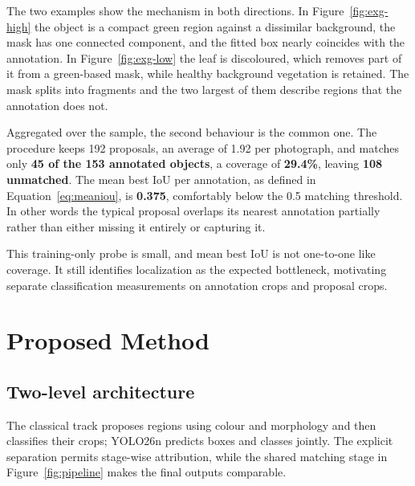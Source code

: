 \documentclass[a4paper,8pt]{article}
\begin{document}
The two examples show the mechanism in both directions. In Figure~\ref{fig:exg-high} the object
is a compact green region against a dissimilar background, the mask has one connected component,
and the fitted box nearly coincides with the annotation. In Figure~\ref{fig:exg-low} the leaf is
discoloured, which removes part of it from a green-based mask, while healthy background
vegetation is retained. The mask splits into fragments and the two largest of them describe
regions that the annotation does not.

Aggregated over the sample, the second behaviour is the common one. The procedure keeps 192
proposals, an average of 1.92 per photograph, and matches only \textbf{45 of the 153 annotated
objects}, a coverage of \textbf{29.4\%}, leaving \textbf{108 unmatched}. The mean best IoU per
annotation, as defined in Equation~\eqref{eq:meaniou}, is \textbf{0.375}, comfortably below the
0.5 matching threshold. In other words the typical proposal overlaps its nearest annotation
partially rather than either missing it entirely or capturing it.

This training-only probe is small, and mean best IoU is not one-to-one like coverage. It still
identifies localization as the expected bottleneck, motivating separate classification
measurements on annotation crops and proposal crops.

\section{Proposed Method}
\label{sec:method}

\subsection{Two-level architecture}

The classical track proposes regions using colour and morphology and then classifies their
crops; YOLO26n predicts boxes and classes jointly. The explicit separation permits stage-wise
attribution, while the shared matching stage in Figure~\ref{fig:pipeline} makes the final outputs
comparable.
\end{document}
